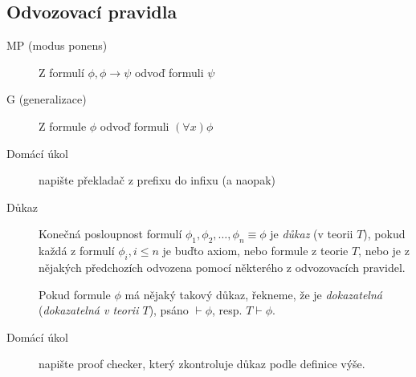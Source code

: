 \documentclass[a4paper]{article}
\begin{document}
	\subsection{Odvozovací pravidla}
	\begin{description}
		\item[MP (modus ponens)] Z formulí $\phi, \phi \to \psi$ odvoď formuli $\psi$
		\item[G (generalizace)] Z formule $\phi$ odvoď formuli $(\forall x) \phi$
	\end{description}

	
	\begin{description}
		\item[Domácí úkol] napište překladač z prefixu do infixu (a naopak)

		\item[Důkaz] Konečná posloupnost formulí $\phi_1, \phi_2, \ldots, \phi_n \equiv \phi$ je
			\textit{důkaz} (v teorii $T$), pokud každá z formulí $\phi_i, i \le n$ je buďto
			axiom, nebo formule z teorie $T$, nebo je z nějakých předchozích odvozena pomocí některého
			z odvozovacích pravidel.

			Pokud formule $\phi$ má nějaký takový důkaz, řekneme, že je \textit{dokazatelná}
			(\textit{dokazatelná v teorii $T$}), psáno $\vdash \phi$, resp. $T \vdash \phi$.

		\item[Domácí úkol] napište proof checker, který zkontroluje důkaz podle
			definice výše.


\end{description}
\end{document}
